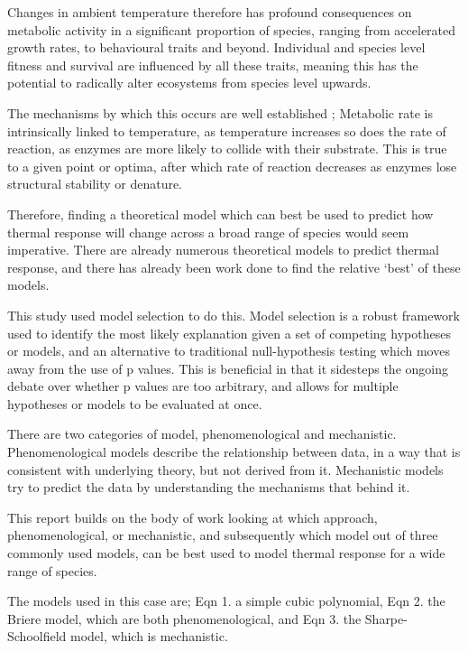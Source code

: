 \documentclass[11pt]{article}
\begin{document}
Changes in ambient temperature therefore has profound consequences on metabolic activity in a significant proportion of species, ranging from accelerated growth rates\citep{Brown2004}, to behavioural traits\citep{Saastamoinen2008} and beyond. Individual and species level fitness\citep{Gilchrist1995} and survival\citep{Huey2009} are influenced by all these traits, meaning this has the potential to radically alter ecosystems from species level upwards.

The mechanisms by which this occurs are well established \citep{Brown2004, Savage2004};
Metabolic rate is intrinsically linked to temperature, as temperature increases so does the rate of reaction, as enzymes are more likely to collide with their substrate. This is true to a given point or optima, after which rate of reaction decreases as enzymes lose structural stability or denature. 

Therefore, finding a theoretical model which can best be used to predict how thermal response will change across a broad range of species would seem imperative. There are already numerous theoretical models to predict thermal response, and there has already been work done to find the relative ‘best’ of these models\citep{Angilletta2006, Shi2010}. 

This study used model selection to do this. Model selection is a robust framework used to identify the most likely explanation given a set of competing hypotheses or models\citep{Johnson2004}, and an alternative to traditional null-hypothesis testing which moves away from the use of p values. This is beneficial in that it sidesteps the ongoing debate over whether p values are too arbitrary, and allows for multiple hypotheses or models to be evaluated at once.  

There are two categories of model, phenomenological and mechanistic. Phenomenological models describe the relationship between data, in a way that is consistent with underlying theory, but not derived from it. Mechanistic models try to predict the data by understanding the mechanisms that behind it. 

This report builds on the body of work looking at which approach, phenomenological, or mechanistic, and subsequently which model out of three commonly used models, can be best used to model thermal response for a wide range of species.  

The models used in this case are; Eqn 1. a simple cubic polynomial, Eqn 2. the Briere model\citep{Briere1999}, which are both phenomenological, and Eqn 3. the Sharpe-Schoolfield model\citep{Schoolfield1981}, which is mechanistic. 
\end{document}

